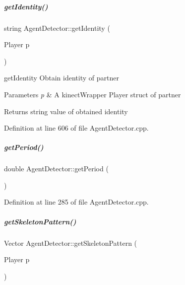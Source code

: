 \mbox{\label{group__agentDetector_af559f7bc17005f4bb49931533deffe5e}} 
\subparagraph{\texorpdfstring{get\+Identity()}{getIdentity()}}
{\footnotesize\ttfamily string Agent\+Detector\+::get\+Identity (\begin{DoxyParamCaption}\item[{Player}]{p }\end{DoxyParamCaption})}



get\+Identity Obtain identity of partner 


\begin{DoxyParams}{Parameters}
{\em p} & A kinect\+Wrapper Player struct of partner \\
\hline
\end{DoxyParams}
\begin{DoxyReturn}{Returns}
string value of obtained identity 
\end{DoxyReturn}


Definition at line 606 of file Agent\+Detector.\+cpp.

\mbox{\label{group__agentDetector_a8cf24dd16e761eb5492f178e0307e288}} 
\subparagraph{\texorpdfstring{get\+Period()}{getPeriod()}}
{\footnotesize\ttfamily double Agent\+Detector\+::get\+Period (\begin{DoxyParamCaption}{ }\end{DoxyParamCaption})}



Definition at line 285 of file Agent\+Detector.\+cpp.

\mbox{\label{group__agentDetector_a0b84169ad615735082f1fa765469212e}} 
\subparagraph{\texorpdfstring{get\+Skeleton\+Pattern()}{getSkeletonPattern()}}
{\footnotesize\ttfamily Vector Agent\+Detector\+::get\+Skeleton\+Pattern (\begin{DoxyParamCaption}\item[{Player}]{p }\end{DoxyParamCaption})}



